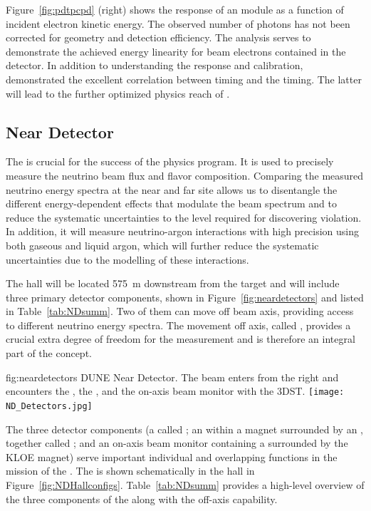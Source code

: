 Figure~\ref{fig:pdtpcpd} (right) shows the response of an %
  module as a function of incident electron kinetic energy.
The observed number of photons has not been corrected for geometry and detection efficiency. The analysis serves to demonstrate the achieved energy linearity for beam electrons contained in the detector.  
In addition to understanding the  response and calibration,  demonstrated the excellent correlation between  timing and the  timing. The latter will lead to the further optimized physics reach of . 


\subsection{Near Detector}
\label{sec:nd-verview}

The   is crucial for the success of the  physics program. It is used to precisely measure the neutrino beam flux and flavor composition. Comparing the measured neutrino energy spectra at the near and far site allows us to disentangle the different energy-dependent effects that modulate the beam spectrum and to reduce the systematic uncertainties to the level required for discovering  violation. In addition, it will measure neutrino-argon interactions with high precision using both gaseous and liquid argon, which will further reduce the systematic uncertainties due to the modelling of these interactions.


The  hall will be located \SI{575}{m} downstream from the target and will include three primary detector components, shown in Figure~\ref{fig:neardetectors}  and listed in Table~\ref{tab:NDsumm}. Two of them can move off beam axis, providing access to different neutrino energy spectra. The movement off axis, called , provides a crucial extra degree of freedom for the  measurement and is therefore an integral part of the   concept. 


\begin{dunefigure}
{fig:neardetectors}
{DUNE Near Detector. The beam enters from the right and encounters
the , the , and the on-axis beam monitor with the 3DST.}
\texttt{[image: ND\_Detectors.jpg]}
\end{dunefigure}

The three detector components (a  called ; an  within a magnet surrounded by an , together called ; and an on-axis beam monitor containing a  surrounded by the KLOE magnet) serve important individual and overlapping functions in the mission of the . 
The   is shown schematically in the   hall in Figure~\ref{fig:NDHallconfigs}.  
Table~\ref{tab:NDsumm} provides a high-level overview of the three components of the   along with the off-axis capability.  

